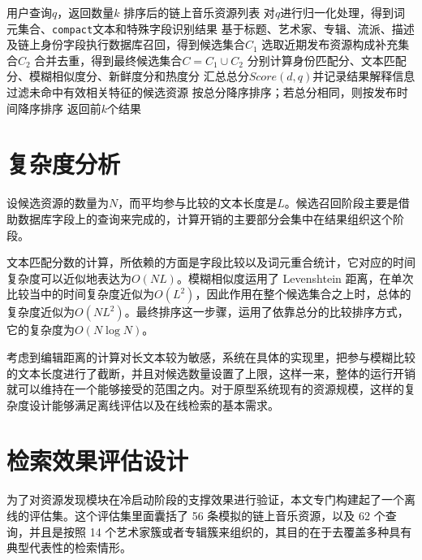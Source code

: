 \begin{algorithm}[H]
    \caption{链上音乐资源发现处理流程}
    \label{algo:chain_resource_rank_rewrite}
    \small
    \begin{algorithmic}[1]
    \Require 用户查询$q$，返回数量$k$
    \Ensure 排序后的链上音乐资源列表
    \State 对$q$进行归一化处理，得到词元集合、\texttt{compact}文本和特殊字段识别结果
    \State 基于标题、艺术家、专辑、流派、描述及链上身份字段执行数据库召回，得到候选集合$C_1$
    \State 选取近期发布资源构成补充集合$C_2$
    \State 合并去重，得到最终候选集合$C=C_1\cup C_2$
        \State 分别计算身份匹配分、文本匹配分、模糊相似度分、新鲜度分和热度分
        \State 汇总总分$Score(d,q)$并记录结果解释信息
    \EndFor
    \State 过滤未命中有效相关特征的候选资源
    \State 按总分降序排序；若总分相同，则按发布时间降序排序
    \State 返回前$k$个结果
    \end{algorithmic}
\end{algorithm}

\section{复杂度分析}

设候选资源的数量为$N$，而平均参与比较的文本长度是$L$。候选召回阶段主要是借助数据库字段上的查询来完成的，计算开销的主要部分会集中在结果组织这个阶段。

文本匹配分数的计算，所依赖的方面是字段比较以及词元重合统计，它对应的时间复杂度可以近似地表达为$O(NL)$。模糊相似度运用了 Levenshtein 距离，在单次比较当中的时间复杂度近似为$O(L^2)$，因此作用在整个候选集合之上时，总体的复杂度近似为$O(NL^2)$。最终排序这一步骤，运用了依靠总分的比较排序方式，它的复杂度为$O(N\log N)$。

考虑到编辑距离的计算对长文本较为敏感，系统在具体的实现里，把参与模糊比较的文本长度进行了截断，并且对候选数量设置了上限，这样一来，整体的运行开销就可以维持在一个能够接受的范围之内。对于原型系统现有的资源规模，这样的复杂度设计能够满足离线评估以及在线检索的基本需求。


\section{检索效果评估设计}

为了对资源发现模块在冷启动阶段的支撑效果进行验证，本文专门构建起了一个离线的评估集。这个评估集里面囊括了 56 条模拟的链上音乐资源，以及 62 个查询，并且是按照 14 个艺术家簇或者专辑簇来组织的，其目的在于去覆盖多种具有典型代表性的检索情形。

